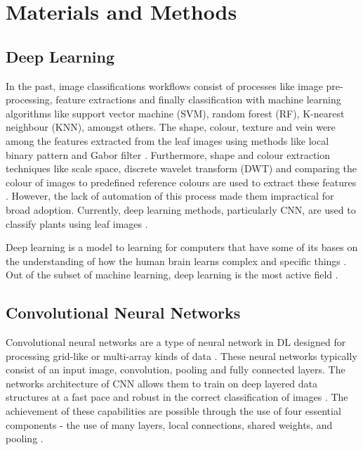 \documentclass[conference]{IEEEtran}
\begin{document}
\section{Materials and Methods}


\subsection{Deep Learning}\label{AA}

In the past, image classifications workflows consist of processes like image pre-processing, feature extractions and finally classification with machine learning algorithms like support vector machine (SVM), random forest (RF), K-nearest neighbour (KNN), amongst others. The shape, colour, texture and vein were among the features extracted from the leaf images using methods like local binary pattern and Gabor filter  \cite{guo2010completed, li2010selection}. Furthermore, shape and colour extraction techniques like scale space, discrete wavelet transform (DWT) and comparing the colour of images to predefined reference colours are used to extract these features \cite{satpute2016color}. However, the lack of automation of this process made them impractical for broad adoption. Currently, deep learning methods, particularly CNN, are used to classify plants using leaf images \cite{sardogan2018plant}.


Deep learning is a model to learning for computers that have some of its bases on the understanding of how the human brain learns complex and specific things \cite{wang2017origin}.
Out of the subset of machine learning, deep learning is the most active field \cite{angermueller2016deep}.

\subsection{Convolutional Neural Networks}
Convolutional neural networks are a type of neural network in DL designed for processing grid-like or multi-array kinds of data \cite{lecun2015deep,goodfellow2016deep}. These neural networks typically consist of an input image, convolution, pooling and fully connected layers. The networks architecture of CNN allows them to train on deep layered data structures at a fast pace and robust in the correct classification of images \cite{nielsen2015neural}. The achievement of these capabilities are possible through the use of four essential components - the use of many layers, local connections, shared weights, and pooling \cite{lecun2015deep}.
\end{document}
